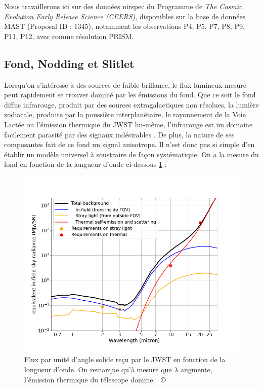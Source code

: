 \documentclass[11pt, a4paper]{article}
\newcommand{\customcite}[1]{\mbox{
  {\small \copyright} \cite{#1}}
}
\begin{document}
Nous travaillerons ici sur des données \gls{nirspec} du Programme de \textit{The Cosmic Evolution Early Release Science (CEERS)}, disponibles sur la base de données MAST  (Proposal ID : 1345), notamment les observations P4, P5, P7, P8, P9, P11, P12, avec comme résolution PRISM.

\subsection{Fond, Nodding et Slitlet}

Lorsqu'on s'intéresse à des sources de faible brillance, le flux lumineux mesuré peut rapidement se trouver dominé par les émissions du fond. Que ce soit le fond diffus infrarouge, produit par des sources extragalactiques non résolues, la lumière zodiacale, produite par la poussière interplanétaire, le rayonnement de la Voie Lactée ou l'émission thermique du JWST lui-même, l'infrarouge est un domaine facilement parasité par des signaux indésirables . De plus, la nature de ses composantes fait de ce fond un signal anisotrope. Il n'est donc pas si simple d'en établir un modèle universel à soustraire de façon systématique. On a la mesure du fond en fonction de la longueur d'onde ci-dessous \ref{fig:background_jwst} : 

\begin{figure}[!h]
  \centering
  \includegraphics[scale=0.55]{assets/background_jwst.png}
  \caption{Flux par unité d'angle solide reçu par le JWST en fonction de la longueur d'onde. On remarque qu'à mesure que $\lambda$ augmente, l'émission thermique du télescope domine. \customcite{jwst_background}}
  \label{fig:background_jwst}
\end{figure}
\end{document}
